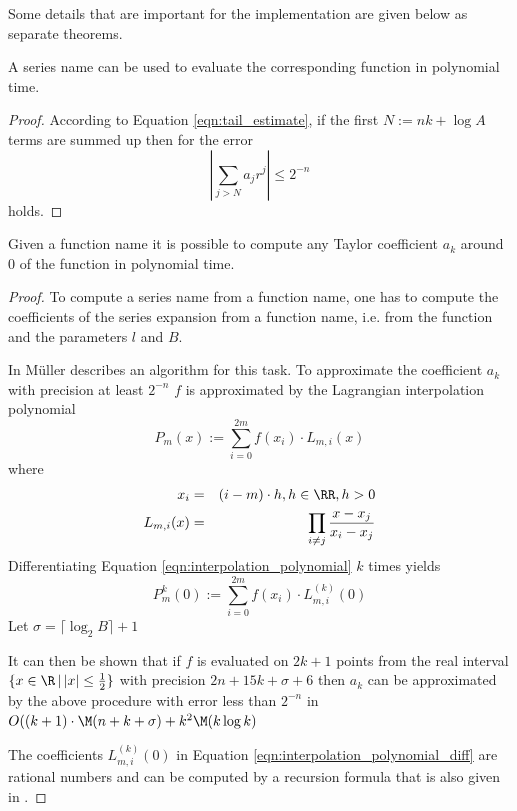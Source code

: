    Some details that are important for the implementation are given below as separate theorems.

   \begin{theorem}
     A series name can be used to evaluate the corresponding function in polynomial time.
     \begin{proof}
       According to Equation \ref{eqn:tail_estimate}, if the first $N :=
       nk+\log A$ terms are summed up then for the error
       $$ \left | \sum_{j > N} a_j r^j \right | \leq 2^{-n} $$
       holds.
     \end{proof}
   \end{theorem}

   \begin{theorem}
    Given a function name it is possible to compute any Taylor coefficient $a_k$ around $0$ of the function
    in polynomial time.
    
	 \begin{proof}
	 	To compute a series name from a function name, one has to compute the coefficients of the series 
    expansion from a function name, i.e. from the function and the parameters $l$ and $B$.

	 	In \cite{Muller1993} M\"uller describes an algorithm for this task.
	 	To approximate the coefficient $a_k$ with precision at least $2^{-n}$ $f$ is approximated by the Lagrangian interpolation
	 	polynomial
	 	\begin{equation}\label{eqn:interpolation_polynomial}
	 		P_m(x)  :=  \sum_{i=0}^{2m} f(x_i) \cdot L_{m,i}(x) 
	 	\end{equation}
	 	where
	 	\begin{eqnarray*}
	 		x_i & = & (i-m) \cdot h , h \in \RR, h > 0 \\
	 		L_{m,i}(x) & = & \prod_{i \neq j} \frac{x-x_j}{x_i-x_j} 
	 	\end{eqnarray*}
	 	Differentiating Equation \ref{eqn:interpolation_polynomial} $k$ times yields
	 	\begin{equation}\label{eqn:interpolation_polynomial_diff}
	 		P_m^k(0)  :=  \sum_{i=0}^{2m} f(x_i) \cdot L_{m,i}^{(k)}(0) 
	 	\end{equation}
	 	Let $\sigma = \lceil \log_2 B \rceil + 1$

	 	It can then be shown that if $f$ is evaluated on $2k+1$ points from the 
	 	real interval $\{x \in \R \,|\, |x| \leq \frac{1}{2}\}$ with precision $2n+15k+\sigma+6$ 
	 	then $a_k$ can be approximated by the above procedure with error less than $2^{-n}$ in 
	 	$O((k+1)\cdot \M(n+k+\sigma) + k^2 \M (k \log k)$

    The coefficients $L_{m,i}^{(k)}(0) $ in Equation \ref{eqn:interpolation_polynomial_diff} 
    are rational numbers and can be computed by a recursion formula that is
    also given in \cite{Muller1993}. 
	 \end{proof}
   \end{theorem}

